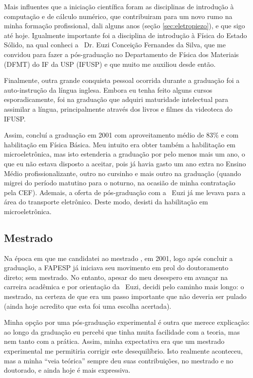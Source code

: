 Mais influentes que a iniciação científica foram as disciplinas de introdução à computação e de cálculo numérico, que contribuiram para um novo rumo na minha formação profissional, dali alguns anos (seção \ref{sec:eletropiezo}), e que sigo até hoje. Igualmente importante foi a disciplina de introdução à Física do Estado Sólido, na qual conheci a \profa\ Dr\rlap{\textordfeminine}. Euzi Conceição Fernandes da Silva, que me convidou para fazer a pós-graduação no Departamento de Física dos Materiais (DFMT) do IF da USP (IFUSP) e que muito me auxiliou desde então.

Finalmente, outra grande conquista pessoal ocorrida durante a graduação foi a auto-instrução da língua inglesa. Embora eu tenha feito alguns cursos esporadicamente, foi na graduação que adquiri maturidade intelectual para assimilar a língua, principalmente através dos livros e filmes da videoteca do IFUSP.

Assim, concluí a graduação em 2001 com aproveitamento médio de 83\% e com habilitação em Física Básica. Meu intuito era obter também a habilitação em microeletrônica, mas isto estenderia a graduação por pelo menos mais um ano, o que eu não estava disposto a aceitar, pois já havia gasto um ano extra no Ensino Médio profissionalizante, outro no cursinho e mais outro na graduação (quando migrei do período matutino para o noturno, na ocasião de minha contratação pela CEF). Ademais, a oferta de pós-graduação com a \profa\ Euzi já me levava para a área do transporte eletrônico. Deste modo, desisti da habilitação em microeletrônica.
 
\subsection{Mestrado}

Na época em que me candidatei ao mestrado , em 2001, logo após concluir a graduação, a FAPESP já iniciava seu movimento em prol do doutoramento direto; sem mestrado. No entanto, apesar do meu desespero em avançar na carreira acadêmica e por orientação da \profa\ Euzi, decidi pelo caminho mais longo: o mestrado, na certeza de que era um passo importante que não deveria ser pulado (ainda hoje acredito que esta foi uma escolha acertada).

Minha opção por uma pós-graduação experimental é outra que merece explicação: ao longo da graduação eu percebi que tinha muita facilidade com a teoria, mas nem tanto com a prática. Assim, minha expectativa era que um mestrado experimental me permitiria corrigir este desequilíbrio. Isto realmente aconteceu, mas a minha ``veia teórica'' sempre deu suas contribuições, no mestrado e no doutorado, e ainda hoje é mais expressiva.

